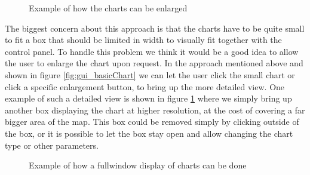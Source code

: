 \documentclass[11pt,a4paper,titlepage,oneside]{report}
\begin{document}
\begin{figure}[!htb]
  \begin{center}
    \caption{Example of how the charts can be enlarged}
    \label{fig:gui_enlargedChart}
  \end{center}
\end{figure}

The biggest concern about this approach is that the charts have to be quite small to fit a box that should be limited in width to visually fit together with the control panel. To handle this problem we think it would be a good idea to allow the user to enlarge the chart upon request. In the approach mentioned above and shown in figure \ref{fig:gui_basicChart} we can let the user click the small chart or click a specific enlargement button, to bring up the more detailed view. One example of such a detailed view is shown in figure \ref{fig:gui_enlargedChart} where we simply bring up another box displaying the chart at higher resolution, at the cost of covering a far bigger area of the map. This box could be removed simply by clicking outside of the box, or it is possible to let the box stay open and allow changing the chart type or other parameters.
\begin{figure}[!htb]
  \begin{center}
    \caption{Example of how a fullwindow display of charts can be done}
    \label{fig:gui_panelChart}
  \end{center}
\end{figure}
\end{document}
